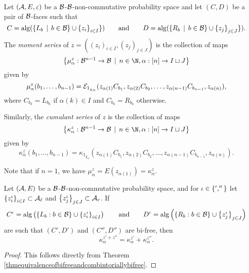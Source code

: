 \begin{definition}
	\label{defnmomentandcumulantseries}
	Let $(\mathcal{A}, E, \varepsilon)$ be a $\mathcal{B}$-$\mathcal{B}$-non-commutative probability space and let $(C, D)$ be a pair of $\mathcal{B}$-faces such that
	\[
	C = \mathrm{alg}(\left\{L_b \, \mid \, b \in \mathcal{B}\right\} \cup \left\{z_i\right\}_{i \in I}\})
	\qquad
	\text{and}
	\qquad
D = \mathrm{alg}(\left\{R_b \, \mid \, b \in \mathcal{B}\right\} \cup \left\{z_j\right\}_{j \in J}\}).
		  \]
		  The \emph{moment series} of $z = ((z_i)_{i \in I}, (z_j)_{j \in J})$ is the collection of maps
		  \[
			  \set{\mu^z_\alpha : \cB^{n-1} \to \cB \, \mid \, n \in \N, \alpha :[n] \to I \sqcup J}
		  \]
		  given by
		  \[
			  \mu^z_\alpha(b_1, \ldots, b_{n-1}) = \mathcal{E}_{1_{\chi_\alpha}}(z_{\alpha(1)} C_{b_1},
				  z_{\alpha(2)} C_{b_2}, \ldots,
				  z_{\alpha(n-1)} C_{b_{n-1}},
			  z_{\alpha(n)}),
		  \]
		  where $C_{b_k} = L_{b_k}$ if $\alpha(k) \in I$ and $C_{b_k} = R_{b_k}$ otherwise.

		  Similarly, the \emph{cumulant series} of $z$ is the collection of maps
		  \[
			  \set{\kappa^z_\alpha : \cB^{n-1} \to \cB \, \mid \, n \in \N, \alpha :[n] \to I \sqcup J}
		  \]
		  given by
		  \[
			  \kappa^z_\alpha(b_1, \ldots, b_{n-1}) = \kappa_{1_{\chi_\alpha}}(z_{\alpha(1)} C_{b_1},
				  z_{\alpha(2)} C_{b_2}, \ldots,
				  z_{\alpha(n-1)} C_{b_{n-1}},
			  z_{\alpha(n)}).
		  \]

		  Note that if $n = 1$, we have $\mu_\alpha^z = E(z_{\alpha(1)}) = \kappa_\alpha^z$.
	  \end{definition}







	  \begin{proposition}
		  Let $(\mathcal{A}, E)$ be a $\mathcal{B}$-$\mathcal{B}$-non-commutative probability space, and for $\iota\in \left\{',''\right\}$ let $\left\{z_i^\iota\right\}_{i\in I}\subset \mathcal{A}_\ell$ and $\left\{z_j^\iota\right\}_{j\in J}\subset \mathcal{A}_r$. If 
		  \[
			  C^\iota = {\operatorname{alg}}\left(\left\{L_b : b \in \mathcal{B}\right\} \cup \left\{z_i^\iota\right\}_{i\in I}\right)\qquad\text{and}\qquad
			  D^\iota = {\operatorname{alg}}\left(\left\{R_b : b \in \mathcal{B}\right\} \cup \left\{z_j^\iota\right\}_{j\in J}\right)
		  \]
		  are such that $(C', D')$ and $(C'', D'')$ are bi-free, then
		  \[
			  \kappa_\alpha^{z'+z''} = \kappa_\alpha^{z'}+\kappa_\alpha^{z''}.
		  \]
	  \end{proposition}

	  \begin{proof}
		  This follows directly from Theorem \ref{thmequivalenceofbifreeandcombintoriallybifree}.
	  \end{proof}




















